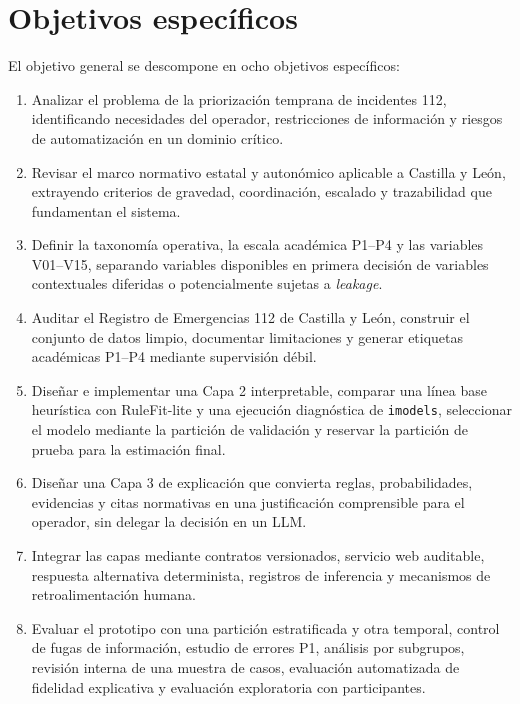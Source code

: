 \section{Objetivos específicos}

El objetivo general se descompone en ocho objetivos específicos:

\begin{enumerate}
    \item[OE1.] Analizar el problema de la priorización temprana de incidentes 112, identificando necesidades del operador, restricciones de información y riesgos de automatización en un dominio crítico.
    \item[OE2.] Revisar el marco normativo estatal y autonómico aplicable a Castilla y León, extrayendo criterios de gravedad, coordinación, escalado y trazabilidad que fundamentan el sistema.
    \item[OE3.] Definir la taxonomía operativa, la escala académica P1--P4 y las variables V01--V15, separando variables disponibles en primera decisión de variables contextuales diferidas o potencialmente sujetas a \textit{leakage}.
    \item[OE4.] Auditar el Registro de Emergencias 112 de Castilla y León, construir el conjunto de datos limpio, documentar limitaciones y generar etiquetas académicas P1--P4 mediante supervisión débil.
    \item[OE5.] Diseñar e implementar una Capa 2 interpretable, comparar una línea base heurística con RuleFit-lite y una ejecución diagnóstica de \texttt{imodels}, seleccionar el modelo mediante la partición de validación y reservar la partición de prueba para la estimación final.
    \item[OE6.] Diseñar una Capa 3 de explicación que convierta reglas, probabilidades, evidencias y citas normativas en una justificación comprensible para el operador, sin delegar la decisión en un LLM.
    \item[OE7.] Integrar las capas mediante contratos versionados, servicio web auditable, respuesta alternativa determinista, registros de inferencia y mecanismos de retroalimentación humana.
    \item[OE8.] Evaluar el prototipo con una partición estratificada y otra temporal, control de fugas de información, estudio de errores P1, análisis por subgrupos, revisión interna de una muestra de casos, evaluación automatizada de fidelidad explicativa y evaluación exploratoria con participantes.
\end{enumerate}

